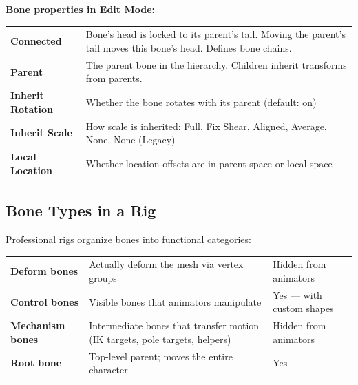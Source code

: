 \textbf{Bone properties in Edit Mode:}

\begin{center}
\begin{tabularx}{\textwidth}{L{3.5cm}X}
\toprule
{}
 &  \\
\midrule
\textbf{Connected} & Bone's head is locked to its parent's tail. Moving the parent's tail moves this bone's head. Defines bone chains. \\
\textbf{Parent} & The parent bone in the hierarchy. Children inherit transforms from parents. \\
\textbf{Inherit Rotation} & Whether the bone rotates with its parent (default: on) \\
\textbf{Inherit Scale} & How scale is inherited: Full, Fix Shear, Aligned, Average, None, None (Legacy) \\
\textbf{Local Location} & Whether location offsets are in parent space or local space \\
\bottomrule
\end{tabularx}
\end{center}

\subsection{Bone Types in a Rig}
\label{subsec:bone-types}

Professional rigs organize bones into functional categories:

\begin{center}
\begin{tabularx}{\textwidth}{L{3cm}L{5cm}X}
\toprule
{}
 &  &  \\
\midrule
\textbf{Deform bones} & Actually deform the mesh via vertex groups & Hidden from animators \\
\textbf{Control bones} & Visible bones that animators manipulate & Yes --- with custom shapes \\
\textbf{Mechanism bones} & Intermediate bones that transfer motion (IK targets, pole targets, helpers) & Hidden from animators \\
\textbf{Root bone} & Top-level parent; moves the entire character & Yes \\
\bottomrule
\end{tabularx}
\end{center}

